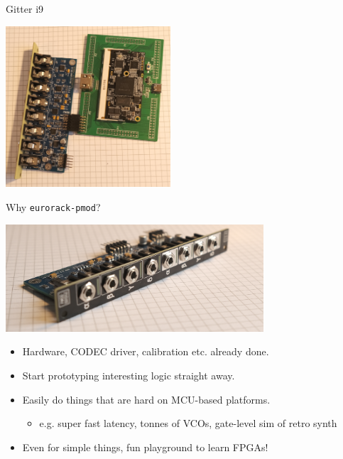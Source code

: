 \documentclass[aspectratio=169]{beamer}
\begin{document}
\begin{frame}{Gitter i9}

\begin{center}
    \includegraphics[height=6cm]{img/gitter_i9.png}
\end{center}

\end{frame}

\begin{frame}{Why \texttt{eurorack-pmod}?}

    \begin{center}
        \includegraphics[height=4cm]{img/frontconndof.png}
    \end{center}

    \begin{itemize}
        \item Hardware, CODEC driver, calibration etc. already done.
        \item Start prototyping interesting logic straight away.
        \item Easily do things that are hard on MCU-based platforms.
            \begin{itemize}
                \item e.g. super fast latency, tonnes of VCOs, gate-level sim of retro synth
            \end{itemize}
        \item Even for simple things, fun playground to learn FPGAs!
    \end{itemize}

\end{frame}
\end{document}
